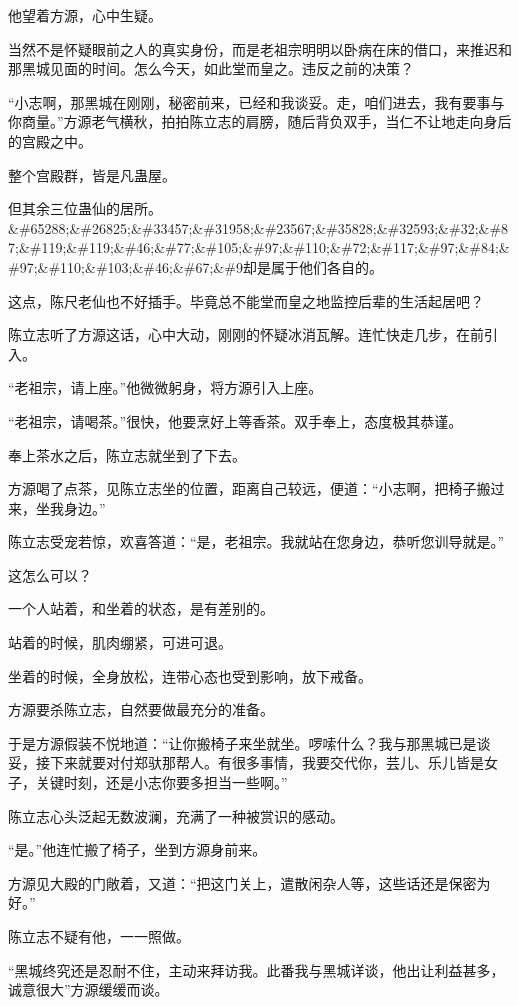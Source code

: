 \begin{this_body}
他望着方源，心中生疑。

当然不是怀疑眼前之人的真实身份，而是老祖宗明明以卧病在床的借口，来推迟和那黑城见面的时间。怎么今天，如此堂而皇之。违反之前的决策？

“小志啊，那黑城在刚刚，秘密前来，已经和我谈妥。走，咱们进去，我有要事与你商量。”方源老气横秋，拍拍陈立志的肩膀，随后背负双手，当仁不让地走向身后的宫殿之中。

整个宫殿群，皆是凡蛊屋。

但其余三位蛊仙的居所。\&\#65288;\&\#26825;\&\#33457;\&\#31958;\&\#23567;\&\#35828;\&\#32593;\&\#32;\&\#87;\&\#119;\&\#119;\&\#46;\&\#77;\&\#105;\&\#97;\&\#110;\&\#72;\&\#117;\&\#97;\&\#84;\&\#97;\&\#110;\&\#103;\&\#46;\&\#67;\&\#9却是属于他们各自的。

这点，陈尺老仙也不好插手。毕竟总不能堂而皇之地监控后辈的生活起居吧？

陈立志听了方源这话，心中大动，刚刚的怀疑冰消瓦解。连忙快走几步，在前引入。

“老祖宗，请上座。”他微微躬身，将方源引入上座。

“老祖宗，请喝茶。”很快，他要烹好上等香茶。双手奉上，态度极其恭谨。

奉上茶水之后，陈立志就坐到了下去。

方源喝了点茶，见陈立志坐的位置，距离自己较远，便道：“小志啊，把椅子搬过来，坐我身边。”

陈立志受宠若惊，欢喜答道：“是，老祖宗。我就站在您身边，恭听您训导就是。”

这怎么可以？

一个人站着，和坐着的状态，是有差别的。

站着的时候，肌肉绷紧，可进可退。

坐着的时候，全身放松，连带心态也受到影响，放下戒备。

方源要杀陈立志，自然要做最充分的准备。

于是方源假装不悦地道：“让你搬椅子来坐就坐。啰嗦什么？我与那黑城已是谈妥，接下来就要对付郑驮那帮人。有很多事情，我要交代你，芸儿、乐儿皆是女子，关键时刻，还是小志你要多担当一些啊。”

陈立志心头泛起无数波澜，充满了一种被赏识的感动。

“是。”他连忙搬了椅子，坐到方源身前来。

方源见大殿的门敞着，又道：“把这门关上，遣散闲杂人等，这些话还是保密为好。”

陈立志不疑有他，一一照做。

“黑城终究还是忍耐不住，主动来拜访我。此番我与黑城详谈，他出让利益甚多，诚意很大”方源缓缓而谈。


\end{this_body}
